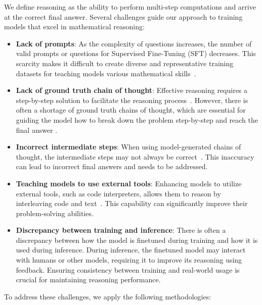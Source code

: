 We define reasoning as the ability to perform multi-step computations and arrive at the correct final answer. Several challenges guide our approach to training models that excel in mathematical reasoning:

\begin{itemize}
    \item \textbf{Lack of prompts}: As the complexity of questions increases, the number of valid prompts or questions for Supervised Fine-Tuning (SFT) decreases. This scarcity makes it difficult to create diverse and representative training datasets for teaching models various mathematical skills~\citep{yu2023metamath, yue2023mammoth, luo2023wizardmath, mitra2024orca, shao2024deepseekmath,yue2024mammoth2}.
    \item \textbf{Lack of ground truth chain of thought}: Effective reasoning requires a step-by-step solution to facilitate the reasoning process~\citep{wei2022chain}. However, there is often a shortage of ground truth chains of thought, which are essential for guiding the model how to break down the problem step-by-step and reach the final answer \citep{zelikman2022star}.
    \item \textbf{Incorrect intermediate steps}: When using model-generated chains of thought, the intermediate steps may not always be correct~\citep{cobbe2021training,uesato2022solving, lightman2023let, wang2023math}. This inaccuracy can lead to incorrect final answers and needs to be addressed.
    \item \textbf{Teaching models to use external tools}: Enhancing models to utilize external tools, such as code interpreters, allows them to reason by interleaving code and text~\citep{gao2023pal, chen2022program, gou2023tora}. This capability can significantly improve their problem-solving abilities.
    \item \textbf{Discrepancy between training and inference}: There is often a discrepancy between how the model is finetuned during training and how it is used during inference. During inference, the finetuned model may interact with humans or other models, requiring it to improve its reasoning using feedback. Ensuring consistency between training and real-world usage is crucial for maintaining reasoning performance.
\end{itemize}

To address these challenges, we apply the following methodologies:

